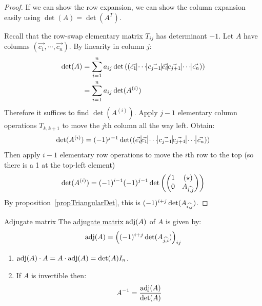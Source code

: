 \documentclass[../Main.tex]{subfiles}
\begin{document}
\begin{proof}
    If we can show the row expansion, we can show the column expansion easily using $\det(A) = \det(A^T)$.

    Recall that the row-swap elementary matrix $T_{ij}$ has determinant $-1$. Let $A$ have columns $(\vec{c_1}, \cdots, \vec{c_n})$. By linearity in column $j$:
    \begin{align*}
        \det(A) &= \sum_{i=1}^{n} a_{ij} \det\left((\vec{c_1} \vline \cdots \vline \vec{c_{j-1}} \vline \vec{e_i} \vline \vec{c_{j+1}} \vline \cdots \vline \vec{c_n})\right) \\
        &= \sum_{i=1}^{n} a_{ij} \det(A^{(i)})
    \end{align*}
    Therefore it suffices to find $\det(A^{(i)})$. Apply $j-1$ elementary column operations $T_{k, k+1}$ to move the $j$th column all the way left. Obtain:
    \begin{equation*}
        \det(A^{(i)}) = (-1)^{j-1} \det((\vec{e_i} \vline \vec{c_1} \vline \cdots \vline \vec{c_{j-1}} \vline \vec{c_{j+1}} \vline \cdots \vline \vec{c_n}))
    \end{equation*}
    Then apply $i-1$ elementary row operations to move the $i$th row to the top (so there is a 1 at the top-left element)
    \begin{equation*}
        \det(A^{(i)}) = (-1)^{i-1} (-1)^{j-1} \det\left(\begin{pmatrix}
            1 & (\star) \\
            0 & {A}_{\widehat{{i},{j}}}
        \end{pmatrix}
        \right)
    \end{equation*}
    By proposition~\ref{propTriangularDet}, this is $(-1)^{i+j} \det({A}_{\widehat{{i},{j}}})$.
\end{proof}
\begin{definition}{Adjugate matrix}
    The \underline{adjugate matrix} $\operatorname{adj}(A)$ of $A$ is given by:
    \begin{equation*}
        \operatorname{adj}(A) = \left((-1)^{i+j} \det({A}_{\widehat{{j},{i}}})\right)_{ij}
    \end{equation*}
\end{definition}
\begin{theorem}
    \begin{enumerate}
        \item $\operatorname{adj}(A) \cdot A = A \cdot \operatorname{adj}(A) = \det(A) I_n$.
        \item If $A$ is invertible then:
            \begin{equation*}
                A^{-1} = \frac{\operatorname{adj}(A)}{\det(A)}
            \end{equation*}
    \end{enumerate}
    \label{thmCramerRule}
\end{theorem}
\end{document}
